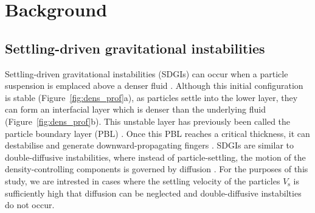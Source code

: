 \documentclass[authoryear,preprint,review,12pt]{elsarticle}
\begin{document}
\section{Background}
\label{sec:bg}

\subsection{Settling-driven gravitational instabilities}
\label{subsec:SDGI}

Settling-driven gravitational instabilities (SDGIs) can occur when a particle suspension is emplaced above a denser fluid \citep{Hoyal99, Blanchette05}. Although this initial configuration is stable (Figure~\ref{fig:dens_prof}a), as particles settle into the lower layer, they can form an interfacial layer which is denser than the underlying fluid (Figure~\ref{fig:dens_prof}b). This unstable layer has previously been called the particle boundary layer (PBL) \citep{Carrazo12}. Once this PBL reaches a critical thickness, it can destabilise and generate downward-propagating fingers \citep{Hoyal99}. SDGIs are similar to double-diffusive instabilities, where instead of particle-settling, the motion of the density-controlling components is governed by diffusion \citep{Stern60}. For the purposes of this study, we are intrested in cases where the settling velocity of the particles $V_{\text{s}}$ is sufficiently high that diffusion can be neglected and double-diffusive instabilties do not occur.
\end{document}
